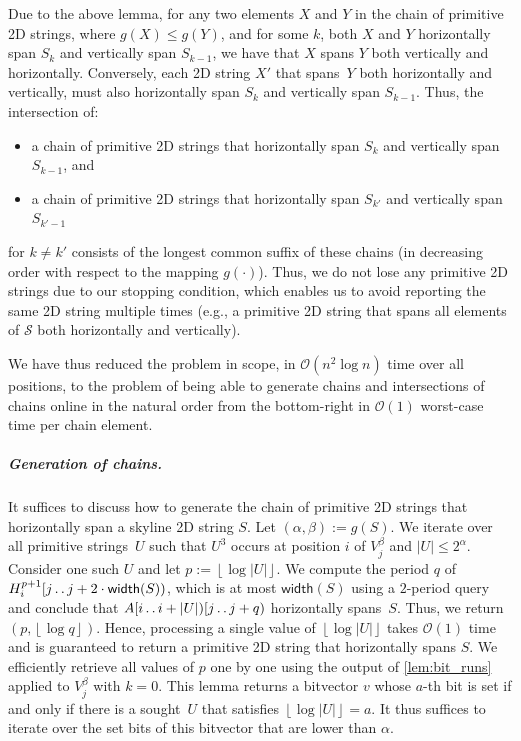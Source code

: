 \documentclass[11pt,letterpaper]{article}
\newcommand{\cO}{\mathcal{O}}
\newcommand{\floor}[1]{\left\lfloor #1 \right\rfloor}
\newcommand{\width}{\textsf{width}}
\def\dd{\mathinner{.\,.}}
\renewcommand{\S}{\mathcal{S}}
\newcommand{\hmeta}[2]{H_{#1}^{#2}}
\newcommand{\vmeta}[2]{V_{#1}^{#2}}
\begin{document}
Due to the above lemma, for any two elements $X$ and $Y$ in the chain of primitive 2D strings, where $g(X)\leq g(Y)$, and for some $k$,
both $X$ and $Y$ horizontally span $S_k$ and vertically span $S_{k-1}$, we have that $X$ spans $Y$ both vertically and horizontally.
Conversely, each 2D string $X'$ that spans~$Y$ both horizontally and vertically, must also horizontally span $S_k$ and vertically span $S_{k-1}$.
Thus, the intersection of:
\begin{itemize}
\item a chain of primitive 2D strings that horizontally span $S_k$ and vertically span $S_{k-1}$, and
\item a chain of primitive 2D strings that horizontally span $S_{k'}$ and vertically span $S_{k'-1}$
\end{itemize}
for $k\neq k'$ consists of the longest common suffix of these chains (in decreasing order with respect to the mapping $g(\cdot)$).
Thus, we do not lose any primitive 2D strings due to our stopping condition, which enables us to avoid reporting the same 2D string multiple times (e.g., a primitive 2D string that spans all elements of $\S$ both horizontally and vertically).

We have thus reduced the problem in scope, in $\cO(n^2 \log n)$ time over all positions, to the problem of being able to generate chains and intersections of chains online in the natural order from the bottom-right in $\cO(1)$ worst-case time per chain element.

\subparagraph{Generation of chains.}
It suffices to discuss how to generate the chain of primitive 2D strings that horizontally span a skyline 2D string $S$.
Let $(\alpha, \beta) := g(S)$.
We iterate over all primitive strings~$U$ such that $U^3$ occurs at position $i$ of $\vmeta{j}{\beta}$ and $|U|\leq 2^\alpha$.
Consider one such $U$ and let $p:=\floor{\log |U|}$.
We compute the period $q$ of $\hmeta{i}{p+1}[j \dd j+2\cdot \width(S))$, which is at most $\width(S)$ using a $2$-period query and conclude that $A[i \dd i+|U|)[j \dd j+q)$ horizontally spans~$S$.
Thus, we return $(p,\floor{\log q})$.
Hence, processing a single value of $\floor{\log|U|}$ takes $\cO(1)$ time and is guaranteed to return a primitive 2D string that horizontally spans $S$.
We efficiently retrieve all values of $p$ one by one using the output of \cref{lem:bit_runs} applied to $\vmeta{j}{\beta}$ with $k=0$.
This lemma returns a bitvector $v$ whose $a$-th bit is set if and only if there is a sought~$U$ that satisfies $\floor{\log |U|}=a$.
It thus suffices to iterate over the set bits of this bitvector that are lower than $\alpha$.
\end{document}
